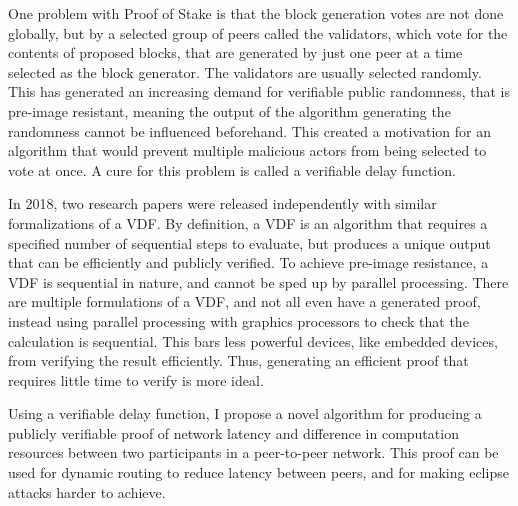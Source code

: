 One problem with Proof of Stake is that the block generation votes are not done globally, but by a selected group of peers called the validators, which vote for the contents of proposed blocks, that are generated by just one peer at a time selected as the block generator. The validators are usually selected randomly. This has generated an increasing demand for verifiable public randomness, that is pre-image resistant, meaning the output of the algorithm generating the randomness cannot be influenced beforehand. This created a motivation for an algorithm that would prevent multiple malicious actors from being selected to vote at once. A cure for this problem is called a verifiable delay function.

In 2018, two research papers were released independently with similar formalizations of a VDF.\cite{Wesolowski2018-rf}\cite{Pietrzak2018-xs} By definition, a VDF is an algorithm that requires a specified number of sequential steps to evaluate, but produces a unique output that can be efficiently and publicly verified.\cite{Boneh_undated-ml} To achieve pre-image resistance, a VDF is sequential in nature, and cannot be sped up by parallel processing. There are multiple formulations of a VDF, and not all even have a generated proof, instead using parallel processing with graphics processors to check that the calculation is sequential.\cite{Yakovenko2018-zn} This bars less powerful devices, like embedded devices, from verifying the result efficiently. Thus, generating an efficient proof that requires little time to verify is more ideal.\cite{Boneh_undated-ml}

Using a verifiable delay function, I propose a novel algorithm for producing a publicly verifiable proof of network latency and difference in computation resources between two participants in a peer-to-peer network. This proof can be used for dynamic routing to reduce latency between peers, and for making eclipse attacks harder to achieve.
